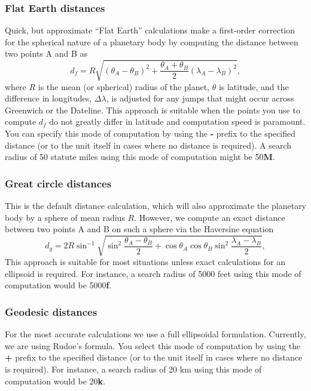 \subsubsection{Flat Earth distances}
Quick, but approximate ``Flat Earth'' calculations make a first-order correction
for the spherical nature of a planetary body by computing the distance between
two points A and B as
\begin{equation}
	d_f = R \sqrt{(\theta_A - \theta_B)^2 + \frac{\theta_A + \theta_B}{2}(\lambda_A - \lambda_B)^2},
	\label{eq:flatearth}
\end{equation}
where $R$ is the mean (or spherical) radius of the planet, $\theta$ is latitude, and the difference in longitudes, $\Delta \lambda$,
is adjusted for any jumps that might occur across Greenwich or the Dateline.  This approach is suitable
when the points you use to compute $d_f$ do not greatly differ in latitude and computation
speed is paramount. You can specify this mode of computation by using the {\bf -} prefix to
the specified distance (or to the unit itself in cases where no distance is required).
A search radius of 50 statute miles using this mode of computation might be 50{\bf M}.

\subsubsection{Great circle distances}
This is the default distance calculation, which will also approximate the planetary body by a sphere of mean
radius $R$. However, we compute an exact distance between two points A and B on such a sphere via
the Haversine equation
\begin{equation}
	d_g = 2R \sin^{-1}  {\sqrt{\sin^2\frac{\theta_A - \theta_B}{2} + \cos \theta_A \cos \theta_B \sin^2 \frac{\lambda_A - \lambda_B}{2}} },
	\label{eq:greatcircle}
\end{equation}
This approach is suitable for most situations unless exact calculations for an ellipsoid
is required.  For instance, a search radius of 5000 feet using this mode of computation would be 5000{\bf f}.


\subsubsection{Geodesic distances}
For the most accurate calculations we use a full ellipsoidal formulation.  Currently,
we are using Rudoe's formula.  You select this mode of computation by using the {\bf +} prefix to
the specified distance (or to the unit itself in cases where no distance is required).
For instance, a search radius of 20 km using this mode of computation would be 20{\bf k}.

